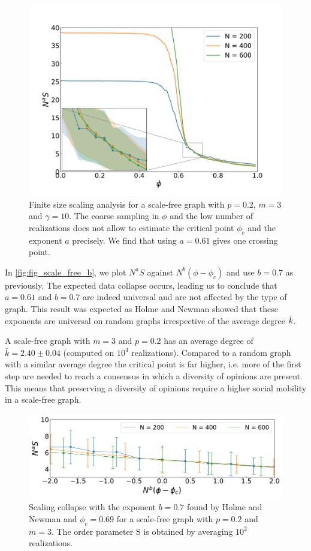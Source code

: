 \documentclass[11pt]{article}
\begin{document}
\begin{figure}
    \centering
    \includegraphics[width =\linewidth]{figures/Fig_scalefree.pdf}
    \caption{Finite size scaling analysis for a scale-free graph with $p=0.2$, $m=3$ and $\gamma=10$. The coarse sampling in $\phi$ and the low number of realizations does not allow to estimate the critical point $\phi_c$ and the exponent $a$ precisely. We find that using $a=0.61$ gives one crossing point.}
    \label{fig:Fig_scalefree}
\end{figure}

In \autoref{fig:fig_scale_free_b}, we plot $N^aS$ against $N^b(\phi-\phi_c)$ and use $b=0.7$ as previously. The expected data collapse occurs, leading us to conclude that $a=0.61$ and $b=0.7$ are indeed universal and are not affected by the type of graph. This result was expected as Holme and Newman showed that these exponents are universal on random graphs irrespective of the average degree $\Bar{k}$.

A scale-free graph with $m=3$ and $p=0.2$ has an average degree of $\bar{k}=2.40\pm0.04$ (computed on $10^4$ realizations). Compared to a random graph with a similar average degree the critical point is far higher, i.e. more of the first step are needed to reach a consensus in which a diversity of opinions are present. This means that preserving a diversity of opinions require a higher social mobility in a scale-free graph.

\begin{figure}
    \centering
    \includegraphics[width =\linewidth]{figures/Fig3_scalefree_b.pdf}
    \caption{Scaling collapse with the exponent $b=0.7$ found by Holme and Newman and $\phi_c=0.69$ for a scale-free graph with $p=0.2$ and $m=3$. The order parameter S is obtained by averaging $10^2$ realizations.}
    \label{fig:fig_scale_free_b}
\end{figure}
\end{document}
